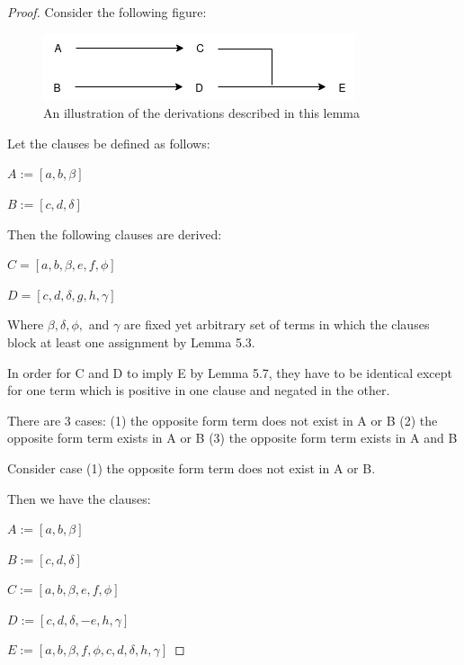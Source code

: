 \documentclass[manuscript]{acmart}
\begin{document}
    \begin{proof}
        Consider the following figure:

        \begin{figure}[h]
            \includegraphics[scale=0.8]{519a}
            \caption{An illustration of the derivations described in this lemma}
        \end{figure}

        Let the clauses be defined as follows:

        $A := [a, b, \beta]$

        $B := [c, d, \delta]$

        Then the following clauses are derived:

        $C = [a, b, \beta, e, f, \phi]$

        $D = [c, d, \delta, g, h, \gamma]$


        Where $\beta, \delta, \phi,$ and $\gamma$ are fixed yet arbitrary set of terms in which the clauses block at least one assignment by Lemma 5.3.

        In order for C and D to imply E by Lemma 5.7, they have to be identical except for one term which is positive in one clause and negated in the other.

        There are 3 cases:
        (1) the opposite form term does not exist in A or B
        (2) the opposite form term exists in A or B
        (3) the opposite form term exists in A and B
        
        Consider case (1) the opposite form term does not exist in A or B.

        Then we have the clauses:

        $A := [a, b, \beta]$

        $B := [c, d, \delta]$

        $C := [a, b, \beta, e, f, \phi]$

        $D := [c, d, \delta, -e, h, \gamma]$

        $E := [a, b, \beta, f, \phi, c, d, \delta, h, \gamma]$


\end{proof}
\end{document}
